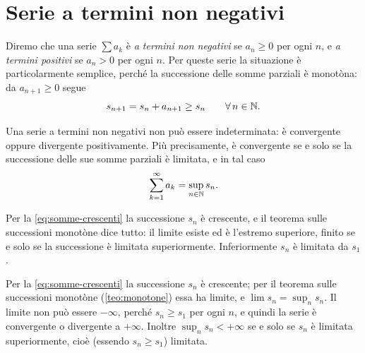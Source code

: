 \section{Serie a termini non negativi}
\label{sec:serie-positive}

Diremo che una serie $\sum a_{k}$ è \emph{a termini non negativi} se $a_{n}\ge0$ per ogni $n$,
e \emph{a termini positivi} se $a_{n}>0$ per ogni $n$. Per queste serie la situazione è
particolarmente semplice, perché la successione delle somme parziali è monotòna: da
$a_{n+1}\ge0$ segue
\begin{equation}\label{eq:somme-crescenti}
  s_{n+1}=s_{n}+a_{n+1}\ge s_{n} \qquad\forall\, n\in\mathbb{N} .
\end{equation}

\begin{teorema}\label{teo:serie-positive}
Una serie a termini non negativi non può essere indeterminata: è convergente oppure
divergente positivamente. Più precisamente, è convergente se e solo se la successione
delle sue somme parziali è limitata, e in tal caso
\begin{equation}\label{eq:somma-sup}
  \sum_{k=1}^{\infty}a_{k}=\sup_{n\in\mathbb{N}}s_{n} .
\end{equation}
\end{teorema}

\begin{schema}
\end{schema}

\begin{strategia}
Per la \eqref{eq:somme-crescenti} la successione $s_{n}$ è crescente, e il teorema sulle
successioni monotòne dice tutto: il limite esiste ed è l'estremo superiore, finito se e
solo se la successione è limitata superiormente. Inferiormente $s_{n}$ è limitata da $s_{1}$.
\end{strategia}

\begin{dimostrazione}
Per la \eqref{eq:somme-crescenti} la successione $s_{n}$ è crescente; per il teorema sulle
successioni monotòne (\cref{teo:monotone}) essa ha limite, e $\lim s_{n}=\sup_{n}s_{n}$.
Il limite non può essere $-\infty$, perché $s_{n}\ge s_{1}$ per ogni $n$, e quindi la serie è
convergente o divergente a $+\infty$. Inoltre $\sup_{n}s_{n}<+\infty$ se e solo se $s_{n}$ è
limitata superiormente, cioè (essendo $s_{n}\ge s_{1}$) limitata.
\end{dimostrazione}

